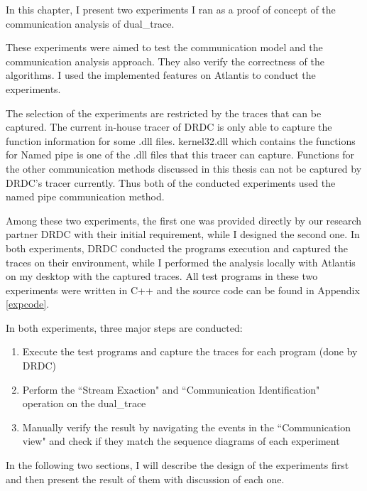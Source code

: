 


\label{chapter:Exp}
In this chapter, I present two experiments I ran as a proof of concept of the communication analysis of dual\_trace.

These experiments were aimed to test the communication model and the communication analysis approach. They also verify the correctness of the algorithms. I used the implemented features on Atlantis to conduct the experiments.

The selection of the experiments are restricted by the traces that can be captured. The current in-house tracer of DRDC is only able to capture the function information for some .dll files. kernel32.dll which contains the functions for Named pipe is one of the .dll files that this tracer can capture. Functions for the other communication methods discussed in this thesis can not be captured by DRDC's tracer currently.  Thus both of the conducted experiments used the named pipe communication method. 

Among these two experiments, the first one was provided directly by our research partner DRDC with their initial requirement, while I designed the second one. In both experiments, DRDC conducted the programs execution and captured the traces on their environment, while I performed the analysis locally with Atlantis on my desktop with the captured traces. All test programs in these two experiments were written in C++ and the source code can be found in Appendix \ref{expcode}. 

In both experiments, three major steps are conducted:
\begin{enumerate}
\item Execute the test programs and capture the traces for each program (done by DRDC)

\item Perform the ``Stream Exaction" and ``Communication Identification" operation on the dual\_trace

\item Manually verify the result by navigating the events in the ``Communication view" and check if they match the sequence diagrams of each experiment
\end{enumerate}

In the following two sections, I will describe the design of the experiments first and then present the result of them with discussion of each one.

